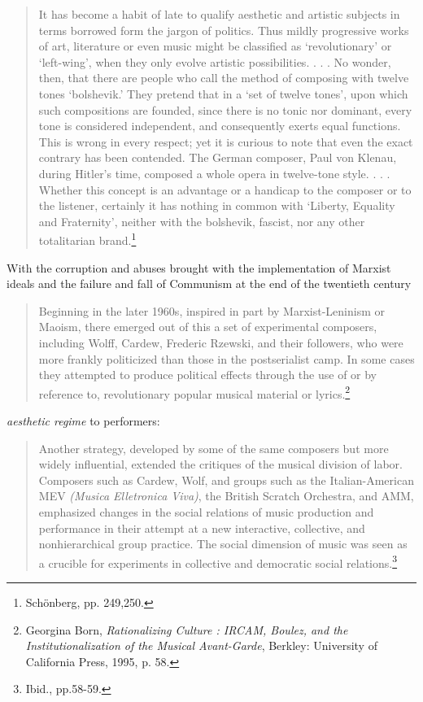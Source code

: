 \begin{quote}
It has become a habit of late to qualify aesthetic and artistic subjects in terms borrowed form the jargon of politics. Thus mildly progressive works of art, literature or even music might be classified as `revolutionary' or `left-wing', when they only evolve artistic possibilities. . . . No wonder, then, that there are people who call the method of composing with twelve tones `bolshevik.' They pretend that in a `set of twelve tones', upon which such compositions are founded, since there is no tonic nor dominant, every tone is considered independent, and consequently exerts equal functions. This is wrong in every respect; yet it is curious to note that even the exact contrary has been contended. The German composer, Paul von Klenau, during Hitler's time, composed a whole opera in twelve-tone style. . . . Whether this concept is an advantage or a handicap to the composer or to the listener, certainly it has nothing in common with `Liberty, Equality and Fraternity', neither with the bolshevik, fascist, nor any other totalitarian brand.\footnote{Sch\"{o}nberg, pp. 249,250.}
\end{quote}

With the corruption and abuses brought with the implementation of Marxist ideals and the failure and fall of Communism at the end of the twentieth century

\begin{quote}
Beginning in the later 1960s, inspired in part by Marxist-Leninism or Maoism, there emerged out of this a set of experimental composers, including Wolff, Cardew, Frederic Rzewski, and their followers, who were more frankly politicized than those in the postserialist camp. In some cases they attempted to produce political effects through the use of or by reference to, revolutionary popular musical material or lyrics.\footnote{Georgina Born, \emph{Rationalizing Culture : IRCAM, Boulez, and the Institutionalization of the Musical Avant-Garde}, Berkley: University of California Press, 1995, p. 58.}
\end{quote}


\emph{aesthetic regime} to performers:

\begin{quote}
Another strategy, developed by some of the same composers but more widely influential, extended the critiques of the musical division of labor. Composers such as Cardew, Wolf, and groups such as the Italian-American MEV \emph{(Musica Elletronica Viva)}, the British Scratch Orchestra, and AMM, emphasized changes in the social relations of music production and performance in their attempt at a new interactive, collective, and nonhierarchical group practice. The social dimension of music was seen as a crucible for experiments in collective and democratic social relations.\footnote{Ibid., pp.58-59.}
\end{quote}


